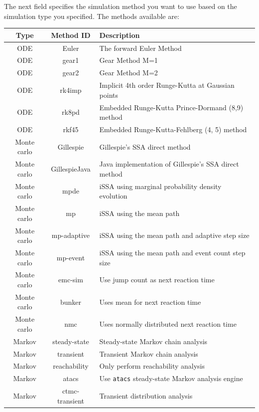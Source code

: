 \documentclass[titlepage,11pt]{article}
\begin{document}
The next field specifies the simulation method you want to use based on the simulation type you specified. The methods available are:
\begin{center}
\begin{tabular}{|c|c|l|}
\hline
Type & Method ID & Description \\ \hline \hline
ODE  & Euler     & The forward Euler Method \\ \hline
ODE  & gear1     & Gear Method M=1 \\ \hline
ODE  & gear2     & Gear Method M=2 \\ \hline
ODE  & rk4imp    & Implicit 4th order Runge-Kutta at Gaussian points \\ \hline
ODE  & rk8pd     & Embedded Runge-Kutta Prince-Dormand (8,9) method \\ \hline
ODE  & rkf45     & Embedded Runge-Kutta-Fehlberg (4, 5) method \\ \hline
Monte carlo & Gillespie & Gillespie's SSA direct method \\ \hline 
Monte carlo & GillespieJava & Java implementation of Gillespie's SSA direct method \\ \hline  
Monte carlo & mpde & iSSA using marginal probability density evolution \\ \hline   
Monte carlo & mp & iSSA using the mean path \\ \hline    
Monte carlo & mp-adaptive & iSSA using the mean path and adaptive step size\\ \hline     
Monte carlo & mp-event & iSSA using the mean path and event count step size \\ \hline     
Monte carlo & emc-sim   & Use jump count as next reaction time \\ \hline
Monte carlo & bunker    & Uses mean for next reaction time \\ \hline
Monte carlo & nmc       & Uses normally distributed next reaction time \\ \hline
Markov & steady-state & Steady-state Markov chain analysis \\ \hline
Markov & transient & Transient Markov chain analysis \\ \hline
Markov & reachability & Only perform reachability analysis \\ \hline
Markov & atacs & Use {\tt atacs} steady-state Markov analysis engine \\ \hline
Markov & ctmc-transient & Transient distribution analysis \\ \hline
\end{tabular}
\end{center}
\end{document}
